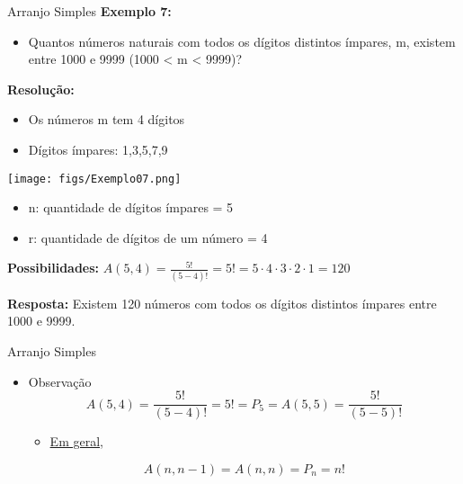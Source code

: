 \documentclass[aspectratio=169]{beamer}
\begin{document}
\begin{frame}{Arranjo Simples}
    \textbf{Exemplo 7:}

    \begin{itemize}
        \item[] Quantos números naturais com todos os dígitos distintos ímpares, m, existem entre 1000 e 9999 (1000 < m < 9999)?
    \end{itemize}

    \vspace{2mm}
    \pause
    \textbf{Resolução:}
    
    \begin{multicols}{2}
        \begin{itemize}
            \item Os números m tem 4 dígitos \pause
            \item Dígitos ímpares: 1,3,5,7,9             
        \end{itemize}

        \columnbreak

        \begin{center}
            \texttt{[image: figs/Exemplo07.png]}
        \end{center}
    \end{multicols}

    \begin{itemize}
        \item[] n: quantidade de dígitos ímpares = 5 \pause
        \item[] r: quantidade de dígitos de um número = 4
        
    \end{itemize}

    \pause 
    \vspace{2mm}
    \textbf{Possibilidades:} $A(5,4) = \frac{5!}{(5-4)!} = 5! = 5 \cdot 4 \cdot 3 \cdot 2 \cdot 1 = 120$

    \textbf{Resposta:} Existem 120 números com todos os dígitos distintos ímpares entre 1000 e 9999.
\end{frame}


\begin{frame}{Arranjo Simples}
    

    \begin{itemize}
        \item Observação
        \vspace{4mm}
        $$A(5,4) = \frac{5!}{(5-4)!} = 5! = P_5 = A(5,5) = \frac{5!}{(5 - 5)!}$$

        \begin{itemize}
            \item \underline{Em geral},
            \vspace{4mm}
                
            
        \end{itemize}
        $$A(n,n-1) = A(n,n) = P_n = n!$$
    \end{itemize}

\end{frame}
\end{document}
